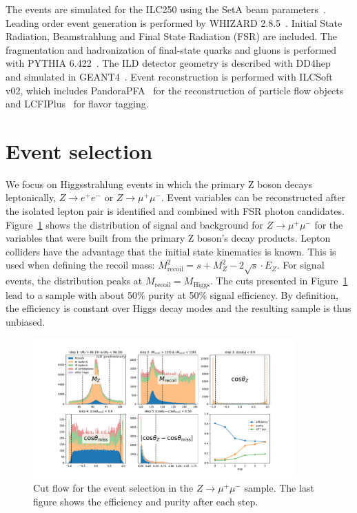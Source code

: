 \documentclass[a4paper,11pt]{article}
\begin{document}
The events are simulated for the ILC250 using the SetA beam parameters~\cite{ILC_Staging_2017}.
Leading order event generation is performed by WHIZARD 2.8.5~\cite{whizard,omega}.
Initial State Radiation, Beamstrahlung and Final State Radiation (FSR) are included.
The fragmentation and hadronization of final-state quarks and gluons
is performed with PYTHIA 6.422~\cite{pythia}.
The ILD detector geometry is described with DD4hep~\cite{DD4hep}
and simulated in GEANT4~\cite{GEANT4}.
Event reconstruction is performed with ILCSoft v02, %
which includes PandoraPFA~\cite{PandoraPFA} for
the reconstruction of particle flow objects
and LCFIPlus~\cite{LCFIPlus} for flavor tagging.


\section{Event selection}\label{sec:selection}

We focus on Higgsstrahlung events in which the primary Z boson decays leptonically,
$Z \to e^+ e^-$ or $Z \to \mu^+ \mu^-$.
Event variables can be reconstructed after the isolated lepton pair is identified
and combined with FSR photon candidates.
Figure~\ref{fig:presel} shows the distribution of signal and background for
$Z \to \mu^+ \mu^-$ for the variables
that were built from the primary Z boson's decay products.
Lepton colliders have the advantage that the initial state kinematics is known.
This is used when defining the recoil mass:
$M_{\mathrm{recoil}}^2 = s + M_Z^2 - 2\sqrt{s} \cdot E_Z$.
For signal events, the distribution peaks at $M_{\mathrm{recoil}} = M_{\mathrm{Higgs}}$.
The cuts presented in Figure~\ref{fig:presel} lead to a sample
with about 50\% purity at 50\% signal efficiency.
By definition, the efficiency is constant over Higgs decay modes
and the resulting sample is thus unbiased.

\begin{figure}[ht]
    \centering
    \includegraphics[width=0.9\textwidth, keepaspectratio]{presel_e2e2_for_proceedings}
    \caption{
        Cut flow for the event selection in the $Z \to \mu^+ \mu^-$ sample.
        The last figure shows the efficiency and purity after each step.
    }\label{fig:presel}
\end{figure}
\end{document}
